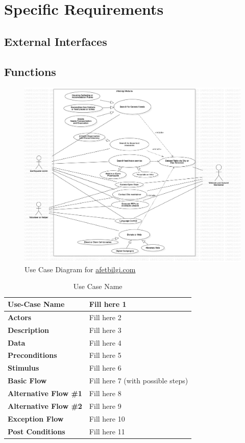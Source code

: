 \section{Specific Requirements}

\subsection{External Interfaces}

\subsection{Functions}

\begin{figure}[H]
  \centering
  \includegraphics[width=\textwidth]{img/use-case-diagram.jpg}
  \caption{Use Case Diagram for \href{https://afetbilgi.com}{afetbilgi.com}}
\end{figure}

\begin{table}[H]
  \centering
  \begin{tabular}{|p{.3\linewidth}|p{.7\linewidth}|}
    \hline
    \textbf{Use-Case Name} & Fill here 1 \\
    \hline
    \textbf{Actors} & Fill here 2 \\
    \hline
    \textbf{Description} & Fill here 3 \\
    \hline
    \textbf{Data} & Fill here 4 \\
    \hline
    \textbf{Preconditions} & Fill here 5 \\
    \hline
    \textbf{Stimulus} & Fill here 6 \\
    \hline
    \textbf{Basic Flow} & Fill here 7 (with possible steps) \\
    \hline
    \textbf{Alternative Flow \#1} & Fill here 8 \\
    \hline
    \textbf{Alternative Flow \#2} & Fill here 9 \\
    \hline
    \textbf{Exception Flow} & Fill here 10 \\
    \hline
    \textbf{Post Conditions} & Fill here 11 \\
    \hline
  \end{tabular}
  \caption{Use Case Name}
\end{table}

